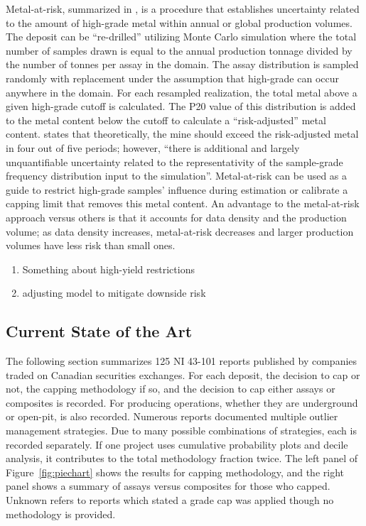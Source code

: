 Metal-at-risk, summarized in \cite{parker2006}, is a procedure that establishes uncertainty related to the amount of high-grade metal within annual or global production volumes. The deposit can be ``re-drilled'' utilizing Monte Carlo simulation where the total number of samples drawn is equal to the annual production tonnage divided by the number of tonnes per assay in the domain. The assay distribution is sampled randomly with replacement under the assumption that high-grade can occur anywhere in the domain. For each resampled realization, the total metal above a given high-grade cutoff is calculated. The P20 value of this distribution is added to the metal content below the cutoff to calculate a ``risk-adjusted'' metal content. \cite{parker2006} states that theoretically, the mine should exceed the risk-adjusted metal in four out of five periods; however, ``there is additional and largely unquantifiable uncertainty related to the representativity of the sample-grade frequency distribution input to the simulation''. Metal-at-risk can be used as a guide to restrict high-grade samples' influence during estimation or calibrate a capping limit that removes this metal content. An advantage to the metal-at-risk approach versus others is that it accounts for data density and the production volume; as data density increases, metal-at-risk decreases and larger production volumes have less risk than small ones.

\begin{enumerate}
    \item Something about high-yield restrictions
    \item adjusting model to mitigate downside risk
\end{enumerate}


\FloatBarrier
\subsection{Current State of the Art}
\label{subsec:02state}


The following section summarizes 125 NI 43-101 reports published by companies traded on Canadian securities exchanges. For each deposit, the decision to cap or not, the capping methodology if so, and the decision to cap either assays or composites is recorded. For producing operations, whether they are underground or open-pit, is also recorded. Numerous reports documented multiple outlier management strategies. Due to many possible combinations of strategies, each is recorded separately. If one project uses cumulative probability plots and decile analysis, it contributes to the total methodology fraction twice. The left panel of Figure~\ref{fig:piechart} shows the results for capping methodology, and the right panel shows a summary of assays versus composites for those who capped. Unknown refers to reports which stated a grade cap was applied though no methodology is provided.

